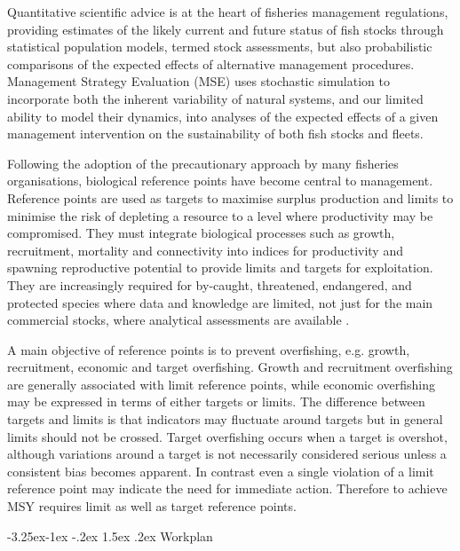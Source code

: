 \documentclass[a4paper, 10pt]{article}
\makeatletter
\renewcommand{\subsection}{\@startsection{subsection}{2}{\z@}%
  {-3.25ex\@plus -1ex \@minus -.2ex}%
  {1.5ex \@plus .2ex}%
  {\normalfont\bfseries\slshape}}
\makeatother
\begin{document}
Quantitative scientific advice is at the heart of fisheries management regulations, providing estimates of the likely current and future status of fish stocks through statistical population models, termed stock assessments, but also probabilistic comparisons of the expected effects of alternative management procedures. Management Strategy Evaluation (MSE) uses stochastic simulation to incorporate both the inherent variability of natural systems, and our limited ability to model their dynamics, into analyses of the expected effects of a given management intervention on the sustainability of both fish stocks and fleets.

Following the adoption of the precautionary approach \citep[PA,][]{garcia1996precautionary} by many fisheries organisations, biological reference points have become central to management. Reference points are used as targets to maximise surplus production and limits to minimise the risk of depleting a resource to a level where productivity may be compromised. They must integrate biological processes such as growth, recruitment, mortality and connectivity into indices for productivity and spawning reproductive potential \citep{kell2015spawning} to provide limits and targets for exploitation. They are increasingly required for by-caught, threatened, endangered, and protected species where data and knowledge are limited, not just for the main commercial stocks, where analytical assessments are available \citep{sainsbury2003ref}.

A main objective of reference points is to prevent overfishing, e.g. growth, recruitment, economic and target overfishing. Growth and recruitment overfishing are generally associated with limit reference points, while economic overfishing may be expressed in terms of either targets or limits. The difference between targets and limits is that indicators may fluctuate around targets but in general limits should not be crossed. Target overfishing occurs when a target is overshot, although variations around a target is not necessarily considered serious unless a consistent bias becomes apparent. In contrast even a single violation of a limit reference point may indicate the need for immediate action. Therefore to achieve MSY requires limit as well as target reference points.

\newpage\subsection{Workplan}
\end{document}
